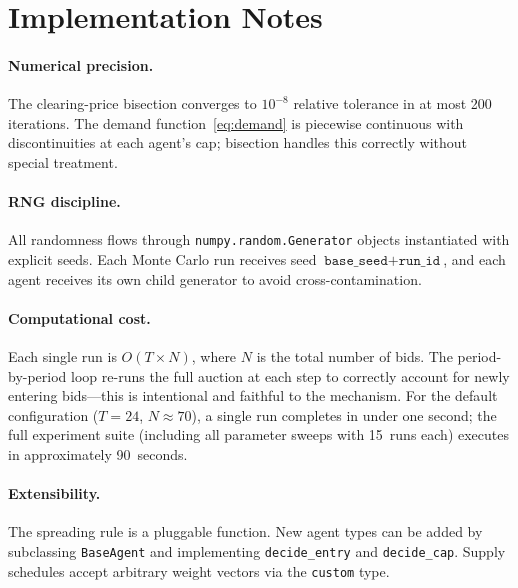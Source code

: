 \documentclass[11pt,a4paper]{article}
\begin{document}
\section{Implementation Notes}
\label{sec:notes}

\paragraph{Numerical precision.}  The clearing-price bisection converges to $10^{-8}$ relative tolerance in at most 200 iterations.  The demand function~\eqref{eq:demand} is piecewise continuous with discontinuities at each agent's cap; bisection handles this correctly without special treatment.

\paragraph{RNG discipline.}  All randomness flows through \texttt{numpy.random.Generator} objects instantiated with explicit seeds.  Each Monte Carlo run receives seed $\texttt{base\_seed} + \texttt{run\_id}$, and each agent receives its own child generator to avoid cross-contamination.

\paragraph{Computational cost.}  Each single run is $O(T \times N)$, where $N$ is the total number of bids.  The period-by-period loop re-runs the full auction at each step to correctly account for newly entering bids—this is intentional and faithful to the mechanism.  For the default configuration ($T = 24$, $N \approx 70$), a single run completes in under one second; the full experiment suite (including all parameter sweeps with 15~runs each) executes in approximately 90~seconds.

\paragraph{Extensibility.}  The spreading rule is a pluggable function.  New agent types can be added by subclassing \texttt{BaseAgent} and implementing \texttt{decide\_entry} and \texttt{decide\_cap}.  Supply schedules accept arbitrary weight vectors via the \texttt{custom} type.


\end{document}
